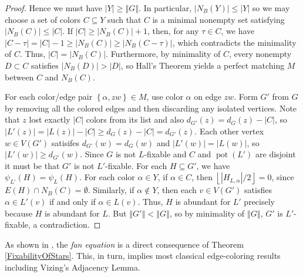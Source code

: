 \documentclass[12pt]{article}
\theoremstyle{plain}
\theoremstyle{definition}
\theoremstyle{remark}
\newcommand{\set}[1]{\left\{ #1 \right\}}
\newcommand{\card}[1]{\left|#1\right|}
\newcommand{\size}[1]{\left\Vert#1\right\Vert}
\newcommand{\floor}[1]{\left\lfloor#1\right\rfloor}
\newcommand{\pot}{\operatorname{pot}}
\begin{document}
\begin{proof}
Hence we must have $|Y| \ge \size{G}$.  In particular, $\card{N_B(Y)} \le |Y|$
so we may choose a set of colors $C \subseteq Y$ such that $C$ is a minimal
nonempty set satisfying $\card{N_B(C)} \le \card{C}$. 
If $|C|\ge |N_B(C)|+1$, then, for any $\tau\in C$, we have
$\card{C-\tau}=\card{C}-1\ge\card{N_B(C)}\ge\card{N_B(C-\tau)}$, which
contradicts the minimality of $C$.  Thus, $\card{C}=\card{N_B(C)}$.
Furthermore, by minimality of $C$, every nonempty $D\subset C$ satisfies
$\card{N_B(D)}>\card{D}$, so Hall's Theorem yields a perfect matching $M$ between $C$
and $N_B(C)$.

For each color/edge pair
$\set{\alpha, zw} \in M$, use color $\alpha$ on edge $zw$.  Form $G'$ from $G$
by removing all the colored edges and then discarding any isolated vertices.
Note that $z$ lost exactly $\card{C}$ colors from its list and also
$d_{G'}(z)=d_G(z)-\card{C}$, so $\card{L'(z)}=\card{L(z)}-\card{C}\ge
d_G(z)-\card{C}=d_{G'}(z)$.  Each other vertex $w\in V(G')$ satisifes
$d_{G'}(w)=d_G(w)$ and $\card{L'(w)}=\card{L(w)}$, so $\card{L'(w)}\ge
d_{G'}(w)$.
Since $G$ is not $L$-fixable and $C$ and $\pot(L')$ are disjoint it must be
that $G'$ is not $L'$-fixable.  
For each $H \subseteq G'$, we have $\psi_{L'}(H) = \psi_{L}(H)$.
For each color $\alpha\in Y$, if $\alpha\in C$, then
$\floor{\card{H_{L,\alpha}}/2}=0$, since $E(H)\cap N_B(C)=\emptyset$.
Similarly, if $\alpha\notin Y$, then each $v\in V(G')$ satisfies $\alpha\in
L'(v)$ if and only if $\alpha\in L(v)$.
Thus, $H$ is abundant for $L'$ precisely because $H$ is abundant for $L$.
But $\size{G'} < \size{G}$, so by minimality of $\size{G}$, $G'$ is
$L'$-fixable, a contradiction.
\end{proof}

As shown in \cite{HallGame}, the \emph{fan equation} is a direct consequence of Theorem \ref{FixabilityOfStars}.  This, in turn, implies most classical edge-coloring results including Vizing's Adjacency Lemma.
\end{document}
